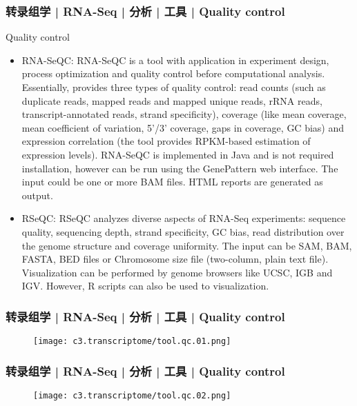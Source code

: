 \begin{frame}
  \frametitle{转录组学 | RNA-Seq | 分析 | 工具 | Quality control}
  {\footnotesize
  \begin{block}{Quality control}
    \begin{itemize}
      \item RNA-SeQC: RNA-SeQC is a tool with application in experiment design, process optimization and quality control before computational analysis. Essentially, provides three types of quality control: read counts (such as duplicate reads, mapped reads and mapped unique reads, rRNA reads, transcript-annotated reads, strand specificity), coverage (like mean coverage, mean coefficient of variation, 5'/3' coverage, gaps in coverage, GC bias) and expression correlation (the tool provides RPKM-based estimation of expression levels). RNA-SeQC is implemented in Java and is not required installation, however can be run using the GenePattern web interface. The input could be one or more BAM files. HTML reports are generated as output.
      \item RSeQC: RSeQC analyzes diverse aspects of RNA-Seq experiments: sequence quality, sequencing depth, strand specificity, GC bias, read distribution over the genome structure and coverage uniformity. The input can be SAM, BAM, FASTA, BED files or Chromosome size file (two-column, plain text file). Visualization can be performed by genome browsers like UCSC, IGB and IGV. However, R scripts can also be used to visualization.
    \end{itemize}
  \end{block}
  }
\end{frame}

\begin{frame}
  \frametitle{转录组学 | RNA-Seq | 分析 | 工具 | Quality control}
  \begin{figure}
    \centering
    \texttt{[image: c3.transcriptome/tool.qc.01.png]}
  \end{figure}
\end{frame}

\begin{frame}
  \frametitle{转录组学 | RNA-Seq | 分析 | 工具 | Quality control}
  \begin{figure}
    \centering
    \texttt{[image: c3.transcriptome/tool.qc.02.png]}
  \end{figure}
\end{frame}

